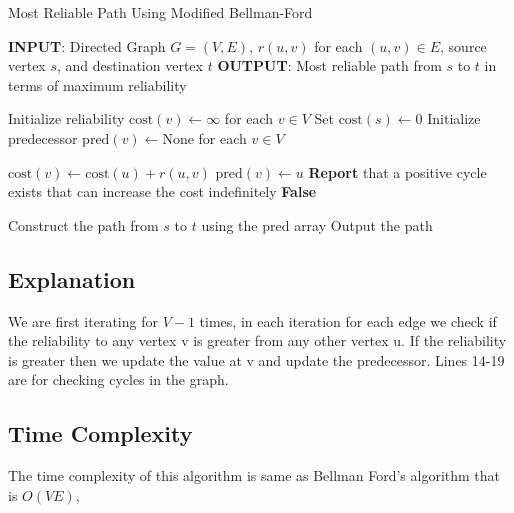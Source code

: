 \documentclass[11pt]{article}
\begin{document}
\begin{algorithm}
\caption{Most Reliable Path Using Modified Bellman-Ford}
\begin{algorithmic}[1]
\STATE \textbf{INPUT}: Directed Graph $G = (V, E)$, $r(u, v)$ for each $(u, v) \in E$, source vertex $s$, and destination vertex $t$
\STATE \textbf{OUTPUT}: Most reliable path from $s$ to $t$ in terms of maximum reliability

\STATE Initialize reliability $\text{cost}(v) \leftarrow \infty$ for each $v \in V$
\STATE Set $\text{cost}(s) \leftarrow 0$
\STATE Initialize predecessor $\text{pred}(v) \leftarrow \text{None}$ for each $v \in V$

            \STATE $\text{cost}(v) \leftarrow \text{cost}(u) + r(u, v)$
            \STATE $\text{pred}(v) \leftarrow u$
        \ENDIF
    \ENDFOR
\ENDFOR
{}
     \STATE
        \textbf{Report} that a positive cycle exists that can increase the cost indefinitely
        \RETURN \textbf{False} 
    \ENDIF
\ENDFOR

\STATE Construct the path from $s$ to $t$ using the $\text{pred}$ array
\STATE Output the path

\end{algorithmic}
\end{algorithm}

\subsection*{Explanation}
We are first iterating for $V - 1$ times, in each iteration for each edge we check if the reliability to any vertex v is greater from any other vertex u. If the reliability is greater then we update the value at v and update the predecessor. Lines 14-19 are for checking cycles in the graph.


\subsection*{Time Complexity}
The time complexity of this algorithm is same as Bellman Ford's algorithm that is \(O(VE) \),
\end{document}
